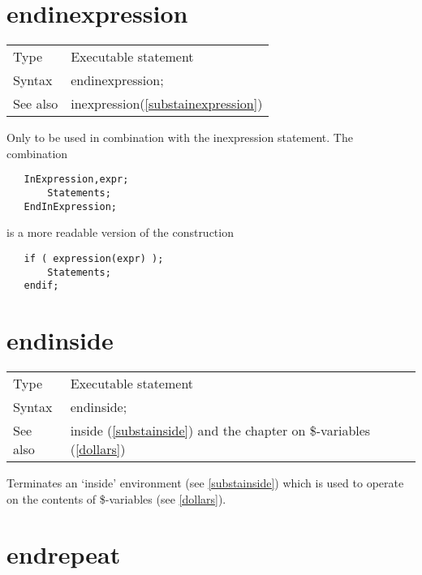  
\section{endinexpression}
\label{substaendinexpression}

\noindent \begin{tabular}{ll}
Type & Executable statement\\
Syntax & endinexpression;
\\ See also & inexpression(\ref{substainexpression})
\end{tabular} \vspace{4mm}

\noindent Only to be used in combination with the 
inexpression statement. The 
combination
\begin{verbatim}
   InExpression,expr;
       Statements;
   EndInExpression;
\end{verbatim}
is a more readable version of the construction
\begin{verbatim}
   if ( expression(expr) );
       Statements;
   endif;
\end{verbatim}
\vspace{10mm}


\section{endinside}
\label{substaendinside}

\noindent \begin{tabular}{ll}
Type & Executable statement\\
Syntax & endinside;
\\ See also & inside (\ref{substainside}) and the chapter on \$-variables 
(\ref{dollars})
\end{tabular}\vspace{4mm}

\noindent Terminates an `inside' 
environment (see \ref{substainside}) which is 
used to operate on the contents of \$-variables (see 
\ref{dollars}).\vspace{10mm}


\section{endrepeat}
\label{substaendrepeat}

